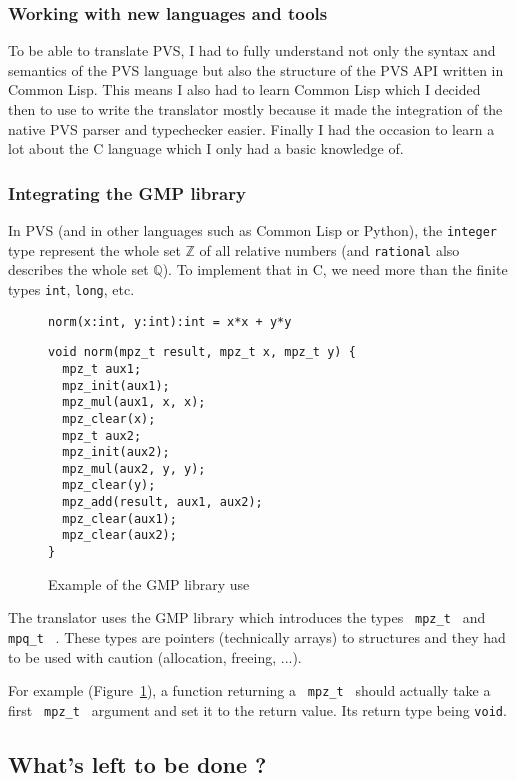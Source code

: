 \documentclass[12pt,a4paper]{article}
\newcommand{\cl}[1]{\texttt{#1}}
\newcommand{\Z}{\mathbb{Z}}
\newcommand{\Q}{\mathbb{Q}}
\newcommand{\mpzt}{ \texttt{ mpz\_t } }
\newcommand{\mpqt}{ \texttt{ mpq\_t } }
\begin{document}
\subsubsection*{Working with new languages and tools}

To be able to translate PVS, I had to fully understand not only the syntax and semantics of the PVS language but also the structure of the PVS API written in Common Lisp. This means I also had to learn Common Lisp which I decided then to use to write the translator mostly because it made the integration of the native PVS parser and typechecker easier. Finally I had the occasion to learn a lot about the C language which I only had a basic knowledge of.


\subsubsection*{Integrating the GMP library}
In PVS (and in other languages such as Common Lisp or Python), the \cl{integer} type represent the whole set $\Z$ of all relative numbers (and \cl{rational} also describes the whole set $\Q$).
To implement that in C, we need more than the finite types \cl{int}, \cl{long}, etc.

\begin{figure}[!ht]
\cl{norm(x:int, y:int):int = x*x + y*y}
\begin{lstlisting}
void norm(mpz_t result, mpz_t x, mpz_t y) {
  mpz_t aux1;
  mpz_init(aux1);
  mpz_mul(aux1, x, x);
  mpz_clear(x);
  mpz_t aux2;
  mpz_init(aux2);
  mpz_mul(aux2, y, y);
  mpz_clear(y);
  mpz_add(result, aux1, aux2);
  mpz_clear(aux1);
  mpz_clear(aux2);
}
\end{lstlisting}
\caption{Example of the GMP library use}
\label{fig:exGMP}
\end{figure}

The translator uses the GMP library which introduces the types \mpzt and \mpqt. These types are pointers (technically arrays) to structures and they had to be used with caution (allocation, freeing, ...).

For example (Figure~\ref{fig:exGMP}), a function returning a \mpzt should actually take a first \mpzt argument and set it to the return value. Its return type being \cl{void}.


\subsection{What's left to be done ?}
\end{document}
